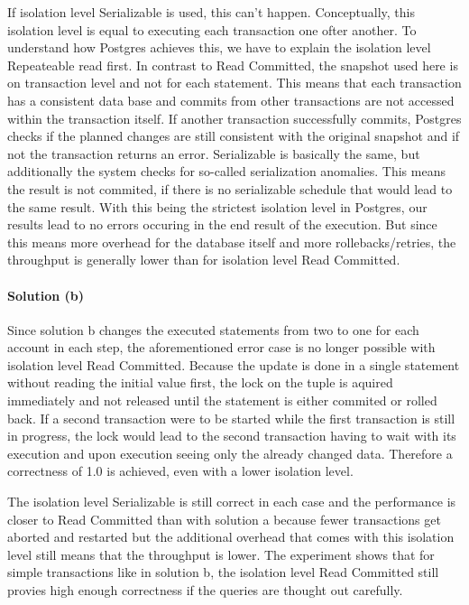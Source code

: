 \documentclass[11pt]{scrartcl}
\begin{document}
If isolation level Serializable is used, this can't happen. Conceptually, this isolation level is equal to executing each transaction one ofter another. To understand how Postgres achieves this, we have to explain the isolation level Repeateable read first. In contrast to Read Committed, the snapshot used here is on transaction level and not for each statement. This means that each transaction has a consistent data base and commits from other transactions are not accessed within the transaction itself. If another transaction successfully commits, Postgres checks if the planned changes are still consistent with the original snapshot and if not the transaction returns an error. Serializable is basically the same, but additionally the system checks for so-called serialization anomalies. This means the result is not commited, if there is no serializable schedule that would lead to the same result. With this being the strictest isolation level in Postgres, our results lead to no errors occuring in the end result of the execution. But since this means more overhead for the database itself and more rollebacks/retries, the throughput is generally lower than for isolation level Read Committed.

\paragraph{Solution (b)}\mbox{}

Since solution b changes the executed statements from two to one for each account in each step, the aforementioned error case is no longer possible with isolation level Read Committed. Because the update is done in a single statement without reading the initial value first, the lock on the tuple is aquired immediately and not released until the statement is either commited or rolled back. If a second transaction were to be started while the first transaction is still in progress, the lock would lead to the second transaction having to wait with its execution and upon execution seeing only the already changed data. Therefore a correctness of 1.0 is achieved, even with a lower isolation level.

The isolation level Serializable is still correct in each case and the performance is closer to Read Committed than with solution a because fewer transactions get aborted and restarted but the additional overhead that comes with this isolation level still means that the throughput is lower. The experiment shows that for simple transactions like in solution b, the isolation level Read Committed still provies high enough correctness if the queries are thought out carefully.
\end{document}
